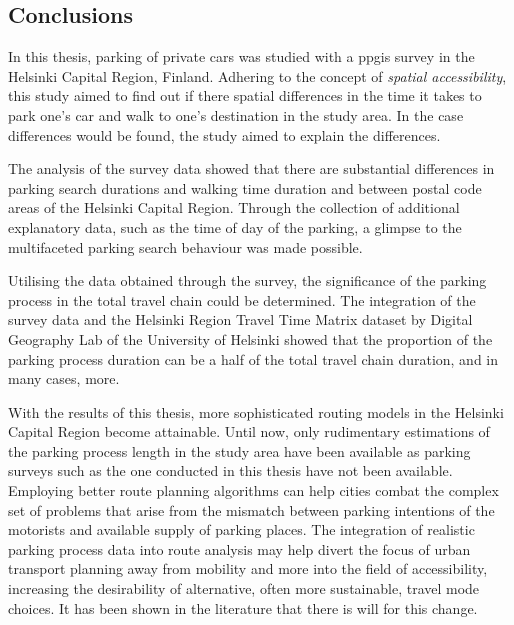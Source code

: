 \subsection{Conclusions}
\justify

In this thesis, parking of private cars was studied with a \acrfull{ppgis} survey in the Helsinki Capital Region, Finland. Adhering to the concept of \textit{spatial accessibility}, this study aimed to find out if there spatial differences in the time it takes to park one's car and walk to one's destination in the study area. In the case differences would be found, the study aimed to explain the differences.

The analysis of the survey data showed that there are substantial differences in parking search durations and walking time duration and between postal code areas of the Helsinki Capital Region. Through the collection of additional explanatory data, such as the time of day of the parking, a glimpse to the multifaceted parking search behaviour was made possible.

Utilising the data obtained through the survey, the significance of the parking process in the total travel chain could be determined. The integration of the survey data and the Helsinki Region Travel Time Matrix dataset by Digital Geography Lab of the University of Helsinki showed that the proportion of the parking process duration can be a half of the total travel chain duration, and in many cases, more.

With the results of this thesis, more sophisticated routing models in the Helsinki Capital Region become attainable. Until now, only rudimentary estimations of the parking process length in the study area have been available as parking surveys such as the one conducted in this thesis have not been available. Employing better route planning algorithms can help cities combat the complex set of problems that arise from the mismatch between parking intentions of the motorists and available supply of parking places. The integration of realistic parking process data into route analysis may help divert the focus of urban transport planning away from mobility and more into the field of accessibility, increasing the desirability of alternative, often more sustainable, travel mode choices. It has been shown in the literature that there is will for this change.

